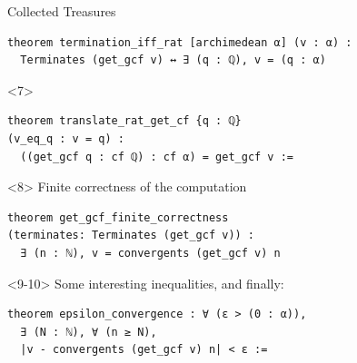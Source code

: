 \documentclass{beamer}
\begin{document}
\begin{frame}[fragile]{Collected Treasures}
\begin{onlyenv}
\begin{verbatim}
theorem termination_iff_rat [archimedean α] (v : α) :
  Terminates (get_gcf v) ↔ ∃ (q : ℚ), v = (q : α)
\end{verbatim}
\begin{visibleenv}<7>
\begin{verbatim}
theorem translate_rat_get_cf {q : ℚ}
(v_eq_q : v = q) :
  ((get_gcf q : cf ℚ) : cf α) = get_gcf v :=
\end{verbatim}
\end{visibleenv}
\end{onlyenv}
\begin{onlyenv}<8>
Finite correctness of the computation
\begin{verbatim}
theorem get_gcf_finite_correctness
(terminates: Terminates (get_gcf v)) :
  ∃ (n : ℕ), v = convergents (get_gcf v) n
\end{verbatim}
\end{onlyenv}
\begin{onlyenv}<9-10>
Some interesting inequalities, and finally:
\begin{verbatim}
theorem epsilon_convergence : ∀ (ε > (0 : α)),
  ∃ (N : ℕ), ∀ (n ≥ N),
  |v - convergents (get_gcf v) n| < ε :=
\end{verbatim}

\vspace{5mm}
\end{onlyenv}
\end{frame}
\end{document}
